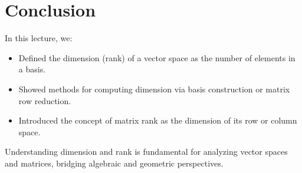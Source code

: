 \documentclass{article}
\begin{document}
\section*{Conclusion}

In this lecture, we:
\begin{itemize}
  \item Defined the dimension (rank) of a vector space as the number of elements in a basis.
  \item Showed methods for computing dimension via basis construction or matrix row reduction.
  \item Introduced the concept of matrix rank as the dimension of its row or column space.
\end{itemize}

Understanding dimension and rank is fundamental for analyzing vector spaces and matrices, bridging algebraic and geometric perspectives.
\end{document}
